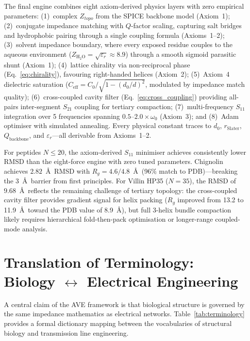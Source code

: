 The final engine combines eight axiom-derived physics layers with zero empirical parameters: (1)~complex $Z_{topo}$ from the SPICE backbone model (Axiom~1); (2)~conjugate impedance matching with $Q$-factor scaling, capturing salt bridges and hydrophobic pairing through a single coupling formula (Axioms~1--2); (3)~solvent impedance boundary, where every exposed residue couples to the aqueous environment ($Z_{\text{H}_2\text{O}} = \sqrt{\varepsilon_r} \approx 8.9$) through a smooth sigmoid parasitic shunt (Axiom~1); (4)~lattice chirality via non-reciprocal phase (Eq.~\ref{eq:chirality}), favouring right-handed helices (Axiom~2); (5)~Axiom~4 dielectric saturation ($C_{\mathrm{eff}} = C_0 / \sqrt{1-(d_0/d)^2}$, modulated by impedance match quality); (6)~cross-coupled cavity filter (Eq.~\ref{eq:cross_coupling}) providing all-pairs inter-segment $S_{21}$ coupling for tertiary compaction; (7)~multi-frequency $S_{11}$ integration over 5 frequencies spanning $0.5$--$2.0 \times \omega_0$ (Axiom~3); and (8)~Adam optimiser with simulated annealing. Every physical constant traces to $d_0$, $r_{\text{Slater}}$, $Q_{\text{backbone}}$, and $\varepsilon_r$---all derivable from Axioms~1--2.

For peptides $N \leq 20$, the axiom-derived $S_{11}$ minimiser achieves consistently lower RMSD than the eight-force engine with zero tuned parameters. Chignolin achieves $2.82$~\AA\ RMSD with $R_g = 4.6 / 4.8$~\AA\ (96\% match to PDB)---breaking the 3~\AA\ barrier from first principles. For Villin HP35 ($N = 35$), the RMSD of $9.68$~\AA\ reflects the remaining challenge of tertiary topology: the cross-coupled cavity filter provides gradient signal for helix packing ($R_g$ improved from 13.2 to 11.9~\AA\ toward the PDB value of 8.9~\AA), but full 3-helix bundle compaction likely requires hierarchical fold-then-pack optimisation or longer-range coupled-mode analysis.

\section{Translation of Terminology: Biology $\leftrightarrow$ Electrical Engineering}
\label{sec:terminology}

A central claim of the AVE framework is that biological structure is governed by the same impedance mathematics as electrical networks. Table~\ref{tab:terminology} provides a formal dictionary mapping between the vocabularies of structural biology and transmission line engineering.

